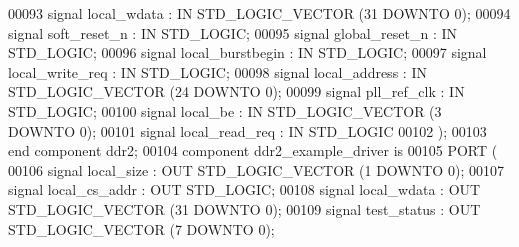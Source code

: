 \begin{DoxyCode}
{00093         \textcolor{keywordflow}{signal} local_wdata : \textcolor{keywordflow}{IN} \textcolor{comment}{STD\_LOGIC\_VECTOR} (\textcolor{vhdllogic}{}\textcolor{vhdllogic}{31} \textcolor{keywordflow}{DOWNTO} \textcolor{vhdllogic}{}\textcolor{vhdllogic}{0});
00094         \textcolor{keywordflow}{signal} soft_reset_n : \textcolor{keywordflow}{IN} \textcolor{comment}{STD\_LOGIC};
00095         \textcolor{keywordflow}{signal} global_reset_n : \textcolor{keywordflow}{IN} \textcolor{comment}{STD\_LOGIC};
00096         \textcolor{keywordflow}{signal} local_burstbegin : \textcolor{keywordflow}{IN} \textcolor{comment}{STD\_LOGIC};
00097         \textcolor{keywordflow}{signal} local_write_req : \textcolor{keywordflow}{IN} \textcolor{comment}{STD\_LOGIC};
00098         \textcolor{keywordflow}{signal} local_address : \textcolor{keywordflow}{IN} \textcolor{comment}{STD\_LOGIC\_VECTOR} (\textcolor{vhdllogic}{}\textcolor{vhdllogic}{24} \textcolor{keywordflow}{DOWNTO} \textcolor{vhdllogic}{}\textcolor{vhdllogic}{0});
00099         \textcolor{keywordflow}{signal} pll_ref_clk : \textcolor{keywordflow}{IN} \textcolor{comment}{STD\_LOGIC};
00100         \textcolor{keywordflow}{signal} local_be : \textcolor{keywordflow}{IN} \textcolor{comment}{STD\_LOGIC\_VECTOR} (\textcolor{vhdllogic}{}\textcolor{vhdllogic}{3} \textcolor{keywordflow}{DOWNTO} \textcolor{vhdllogic}{}\textcolor{vhdllogic}{0});
00101         \textcolor{keywordflow}{signal} local_read_req : \textcolor{keywordflow}{IN} \textcolor{comment}{STD\_LOGIC}
00102       );
00103   \textcolor{keywordflow}{end} \textcolor{keywordflow}{component} \textcolor{vhdlchar}{ddr2};
00104   \textcolor{keywordflow}{component} ddr2_example_driver \textcolor{keywordflow}{is}
00105 \textcolor{keywordflow}{PORT} (
00106     \textcolor{keywordflow}{signal} local_size : \textcolor{keywordflow}{OUT} \textcolor{comment}{STD\_LOGIC\_VECTOR} (\textcolor{vhdllogic}{}\textcolor{vhdllogic}{1} \textcolor{keywordflow}{DOWNTO} \textcolor{vhdllogic}{}\textcolor{vhdllogic}{0});
00107         \textcolor{keywordflow}{signal} local_cs_addr : \textcolor{keywordflow}{OUT} \textcolor{comment}{STD\_LOGIC};
00108         \textcolor{keywordflow}{signal} local_wdata : \textcolor{keywordflow}{OUT} \textcolor{comment}{STD\_LOGIC\_VECTOR} (\textcolor{vhdllogic}{}\textcolor{vhdllogic}{31} \textcolor{keywordflow}{DOWNTO} \textcolor{vhdllogic}{}\textcolor{vhdllogic}{0});
00109         \textcolor{keywordflow}{signal} test_status : \textcolor{keywordflow}{OUT} \textcolor{comment}{STD\_LOGIC\_VECTOR} (\textcolor{vhdllogic}{}\textcolor{vhdllogic}{7} \textcolor{keywordflow}{DOWNTO} \textcolor{vhdllogic}{}\textcolor{vhdllogic}{0});
}
\end{DoxyCode}
